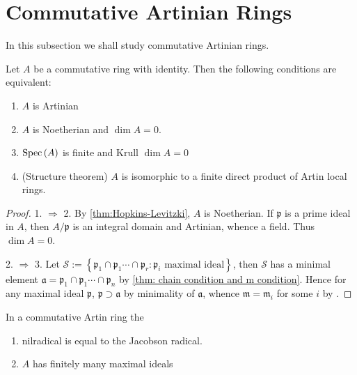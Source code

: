 \section{Commutative Artinian Rings} %
In this subsection we shall study commutative Artinian rings.


\begin{theorem}
    Let $A$ be a commutative ring with identity. Then the following conditions are equivalent:
    \begin{enumerate}
        \item
              $A$ is Artinian
        \item
              $A$ is Noetherian and $\dim A=0$.
        \item
              $\operatorname{Spec} \left(A\right)$ is finite and Krull $\dim A=0$

        \item
              (Structure theorem) $A$ is isomorphic to a finite direct product of Artin local rings.
    \end{enumerate}
    \begin{proof}
        1. $\Rightarrow$ 2.
        By \ref{thm:Hopkins-Levitzki}, $A$ is Noetherian. If $\mathfrak{p}$ is a prime ideal in $A$, then $A / \mathfrak{p}$ is an integral domain and Artinian, whence a field. Thus $\dim A=0$.

        2. $\Rightarrow$ 3.
        Let $\mathcal{S}:=\left\{\mathfrak{p}_1\cap \mathfrak{p}_1\cdots \cap \mathfrak{p}_r:\mathfrak{p}_i \text{ maximal ideal}\right\}$, then $\mathcal{S}$ has a minimal element $\mathfrak{a}=\mathfrak{p}_1\cap \mathfrak{p}_1\cdots \cap \mathfrak{p}_n$ by \ref{thm: chain condition and m condition}.
        Hence for any maximal ideal $\mathfrak{p}$, $\mathfrak{p}\supset \mathfrak{a}$ by minimality of $\mathfrak{a}$, whence $\mathfrak{m}=\mathfrak{m}_i$ for some $i$ by .
    \end{proof}
\end{theorem}

\begin{corollary}
    In a commutative Artin ring the
    \begin{enumerate}
        \item
              nilradical is equal to the Jacobson radical.
        \item
              $A$ has finitely many maximal ideals
    \end{enumerate}
\end{corollary}


